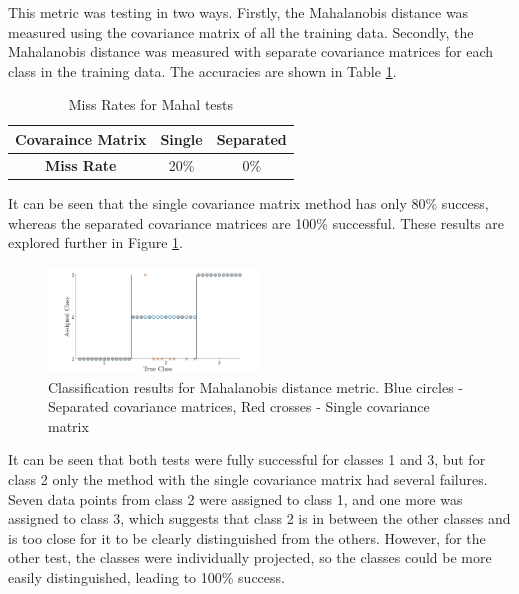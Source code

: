 \documentclass[10pt,twocolumn,letterpaper]{article}
\begin{document}
This metric was testing in two ways. Firstly, the Mahalanobis distance was measured using the covariance matrix of all the training data. Secondly, the Mahalanobis distance was measured with separate covariance matrices for each class in the training data. The accuracies are shown in Table \ref{tab:MissMahal}. 

\begin{table}[H]
\caption{Miss Rates for Mahal tests \label{tab:MissMahal}}
\footnotesize
\begin{center}
\begin{tabular}{|c| c c|}
\hline
\bf Covaraince Matrix & Single & Separated \\ [0.5ex]
\hline
\bf Miss Rate & 20\% & 0\% \\ [0.5ex]
\hline
\end{tabular}
\end{center}
\end{table}

It can be seen that the single covariance matrix method has only 80\% success, whereas the separated covariance matrices are 100\% successful. These results are explored further in Figure \ref{fig:Mahal}.

\begin{figure}
\centering
\includegraphics[width=0.5\textwidth]{../results/Q1Db_Success}
\caption{Classification results for Mahalanobis distance metric. Blue circles - Separated covariance matrices, Red crosses - Single covariance matrix
\label{fig:Mahal}}
\end{figure}

It can be seen that both tests were fully successful for classes 1 and 3, but for class 2 only the method with the single covariance matrix had several failures. Seven data points from class 2 were assigned to class 1, and one more was assigned to class 3, which suggests that class 2 is in between the other classes and is too close for it to be clearly distinguished from the others. However, for the other test, the classes were individually projected, so the classes could be more easily distinguished, leading to 100\% success.

\vspace{-6mm}
\end{document}
